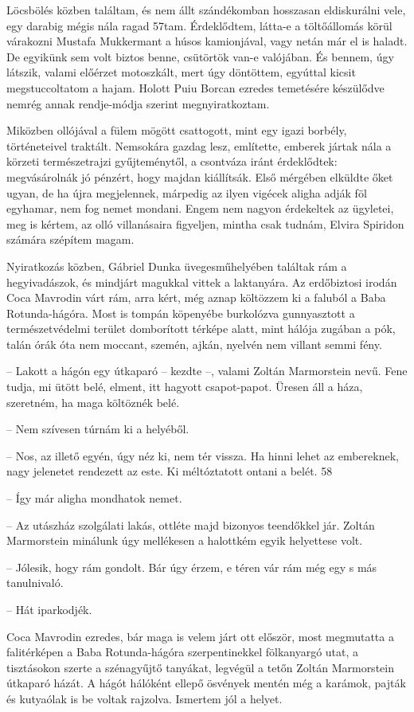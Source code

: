 \documentclass{IEEEtran}
\begin{document}
Löcsbölés közben találtam, és nem állt szándékomban hosszasan eldiskurálni
vele, egy darabig mégis nála ragad 57tam. Érdeklődtem, látta-e a töltőállomás
körül várakozni Mustafa Mukkermant a húsos kamionjával, vagy netán már el is
haladt. De egyikünk sem volt biztos benne, csütörtök van-e valójában. És
bennem, úgy látszik, valami előérzet motoszkált, mert úgy döntöttem, egyúttal
kicsit megstuccoltatom a hajam. Holott Puiu Borcan ezredes temetésére
készülődve nemrég annak rendje-módja szerint megnyiratkoztam.

Miközben ollójával a fülem mögött csattogott, mint egy igazi borbély,
történeteivel traktált. Nemsokára gazdag lesz, említette, emberek jártak nála
a körzeti természetrajzi gyűjteménytől, a csontváza iránt érdeklődtek:
megvásárolnák jó pénzért, hogy majdan kiállítsák. Első mérgében elküldte őket
ugyan, de ha újra megjelennek, márpedig az ilyen vigécek aligha adják föl
egyhamar, nem fog nemet mondani. Engem nem nagyon érdekeltek az ügyletei, meg
is kértem, az olló villanásaira figyeljen, mintha csak tudnám, Elvira Spiridon
számára szépítem magam.

Nyiratkozás közben, Gábriel Dunka üvegesműhelyében találtak rám a
hegyivadászok, és mindjárt magukkal vittek a laktanyára. Az erdőbiztosi irodán
Coca Mavrodin várt rám, arra kért, még aznap költözzem ki a faluból a Baba
Rotunda-hágóra. Most is tompán köpenyébe burkolózva gunnyasztott a
természetvédelmi terület domborított térképe alatt, mint hálója zugában a pók,
talán órák óta nem moccant, szemén, ajkán, nyelvén nem villant semmi fény.

– Lakott a hágón egy útkaparó – kezdte –, valami Zoltán Marmorstein nevű. Fene
tudja, mi ütött belé, elment, itt hagyott csapot-papot. Üresen áll a háza,
szeretném, ha maga költöznék belé.

– Nem szívesen túrnám ki a helyéből.

– Nos, az illető egyén, úgy néz ki, nem tér vissza. Ha hinni lehet az
embereknek, nagy jelenetet rendezett az este. Ki méltóztatott ontani a belét.
58

– Így már aligha mondhatok nemet.

– Az utászház szolgálati lakás, ottléte majd bizonyos teendőkkel jár. Zoltán
Marmorstein minálunk úgy mellékesen a halottkém egyik helyettese volt.

– Jólesik, hogy rám gondolt. Bár úgy érzem, e téren vár rám még egy s más
tanulnivaló.

– Hát iparkodjék.

Coca Mavrodin ezredes, bár maga is velem járt ott először, most megmutatta a
falitérképen a Baba Rotunda-hágóra szerpentinekkel fölkanyargó utat, a
tisztásokon szerte a szénagyűjtő tanyákat, legvégül a tetőn Zoltán Marmorstein
útkaparó házát. A hágót hálóként ellepő ösvények mentén még a karámok, pajták
és kutyaólak is be voltak rajzolva. Ismertem jól a helyet.
\end{document}
